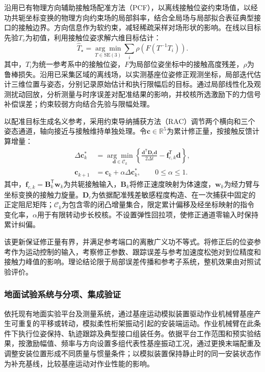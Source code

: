 \documentclass[UTF8,a4paper,zihao=-4,fontset=fandol]{ctexart}
\newcommand{\SE}{\mathrm{SE}(3)}
\begin{document}
沿用已有物理方向辅助接触场配准方法（PCF），以离线接触位姿约束场值，以经功共轭坐标变换的物理方向约束场的局部斜率，结合全局场与局部拟合表征典型接口的接触边界。方向信息作为软约束，减轻稀疏采样对场形状的影响。在线以目标先验$T_v$为初值，利用接触位姿求解六维目标估计：
\begin{equation}
 \widehat T_\star=\underset{T\in\SE}{\arg\min}
 \sum_i\rho\!\left(F(T^{-1}T_i)\right).
 \label{eq:registration}
\end{equation}
其中，$T_i$为统一参考系中的接触位姿，$F$为局部位姿坐标中的接触高度残差，$\rho$为鲁棒损失。沿用已采集区域的离线场，以实测基座位姿修正观测坐标，局部迭代估计三维位置与姿态，分别记录原始估计和执行限幅后的目标。通过局部线性化及观测扰动回放，分析测量与时序误差对配准结果的影响，并校核所选激励下的力信号补偿误差；约束较弱方向结合先验与限幅处理。

以配准目标生成名义参考，采用约束导纳捕获方法（RAC）调节两个横向和三个姿态通道，轴向接近与接触维持单独处理。令$\bm c\in\mathbb R^5$为累计修正量，按接触反馈计算增量：
\begin{equation}
\begin{aligned}
 \Delta\bm c_k^*&=\underset{\bm d\in\mathcal C_k}{\arg\min}
 \left\{\frac{\bm d^{\mathsf T}\bm D_c\bm d}{2\Delta t}
 -\bm f_{c,k}^{\mathsf T}\bm d\right\},\\
 \bm c_{k+1}&=\bm c_k+\alpha\Delta\bm c_k^*,\qquad 0\le\alpha\le1.
\end{aligned}
 \label{eq:capture}
\end{equation}
其中，$\bm f_{c,k}=\bm B_k^{\mathsf T}\bm w_k$为共轭接触输入，$\bm B_k$将修正速度映射为体速度，$\bm w_k$为经力臂与坐标变换的接触力旋量。$\bm D_c$为依据配准残差敏感程度构造、在一次捕获中固定的正定阻尼矩阵；$\mathcal C_k$为包含零的闭凸增量集合，限定累计偏移及经坐标映射的指令变化率，$\alpha$用于有限转动步长校核。不设置弹性回拉项，使修正通道零输入时保持累计纠偏。

该更新保证修正量有界，并满足参考端口的离散广义功不等式。将修正后的位姿参考作为运动控制的输入，考察修正参数、跟踪误差与参考加速度松弛对到位精度和接触力峰值的影响。理论结论限于局部误差传播和参考子系统，整机效果由对照试验评价。

\subsubsection{地面试验系统与分项、集成验证}

依托现有地面实验平台及测量系统，通过基座运动模拟装置驱动作业机械臂基座产生可重复的平移或转动，模拟柔性桁架振动引起的安装端运动。作业机械臂在此条件下执行位姿保持、轨迹跟踪及典型接口组装任务。依据平台工作范围和预实验结果，按激励幅值、频率与方向设置多组代表性基座振动工况，通过更换末端配重及调整安装位置形成不同质量与惯量条件；以模拟装置保持静止时的同一安装状态作为补充基线，比较基座运动对作业性能的影响。
\end{document}
